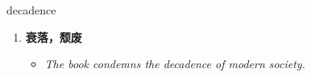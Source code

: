 
\begin{frame}
{\huge decadence}
\begin{center}
\begin{enumerate}\Large
  \item \textbf{衰落，颓废}
  \begin{itemize}
    \item \em{\Large{The book condemns the decadence of modern society.}}
  \end{itemize}
\end{enumerate}
\end{center}
\end{frame}
